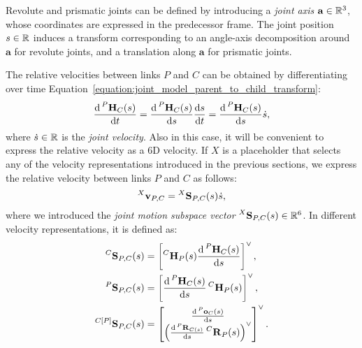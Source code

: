\begin{definition*}
    Revolute and prismatic joints can be defined by introducing a \emph{joint axis} $\mathbf{a} \in \realn^3$, whose coordinates are expressed in the predecessor frame.
    The joint position $\shape \in \realn$ induces a transform corresponding to an angle-axis decomposition around $\mathbf{a}$ for revolute joints, and a translation along $\mathbf{a}$ for prismatic joints.
\end{definition*}

The relative velocities between links $P$ and $C$ can be obtained by differentiating over time Equation~\ref{equation:joint_model_parent_to_child_transform}:
%
\begin{equation*}
    \dv{\homo[P]_C(\shape)}{t} = \dv{\homo[P]_C(\shape)}{\shape} \dv{\shape}{t} = \dv{\homo[P]_C(\shape)}{\shape} \dot{\shape}
    ,
\end{equation*}
%
where $\dot{\shape} \in \realn$ is the \emph{joint velocity}.
Also in this case, it will be convenient to express the relative velocity as a 6D velocity.
If $X$ is a placeholder that selects any of the velocity representations introduced in the previous sections, we express the relative velocity between links $P$ and $C$ as follows:
%
\begin{equation}
    \label{eq:joint_model_velocity_propagation}
    \velsix[X]_{P,C} = \subspacee[X]_{P,C}(\shape) \dot{\shape}
    ,
\end{equation}
%
where we introduced the \emph{joint motion subspace vector} $\subspacee[X]_{P,C}(\shape) \in \realn^6$.
In different velocity representations, it is defined as:
%
\begin{equation}
    \label{eq:motion_subspaces_representations}
    \begin{aligned}
    \subspacee[C]_{P,C}(\shape) &= \left[ \homo[C]_P(\shape) \dv{\homo[P]_C(\shape)}{\shape} \right]^\vee ,\\
    \subspacee[P]_{P,C}(\shape) &= \left[ \dv{\homo[P]_C(\shape)}{\shape} \homo[C]_P(\shape) \right]^\vee ,\\
    \subspacee[{C[P]}]_{P,C}(\shape) &= \begin{bmatrix}
        \dv{\ori[P]_C(\shape)}{\shape} \\
        \left( \dv{\rot[P]_{C(\shape)}}{\shape} \rot[C]_P(\shape) \right)^\vee
    \end{bmatrix}^\vee
    .
\end{aligned}
\end{equation}

